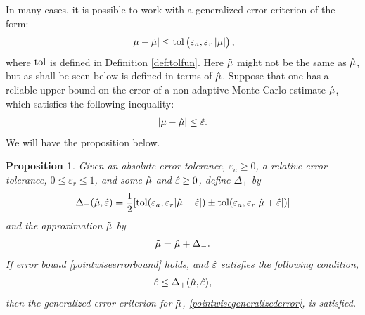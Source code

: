 \documentclass{iitthesis}
\newtheorem{proposition}[theorem]{Proposition}
\theoremstyle{definition}
\begin{document}
In many cases, it is possible to work with a generalized error criterion of the form:
\begin{align}|\mu -\tilde{\mu}| \leq \operatorname{tol} \left(\varepsilon_a,\varepsilon_r \left \lvert \mu \right \rvert\right),\label{pointwisegeneralizederror} 
\end{align}
where $\operatorname{tol}$ is defined in Definition \ref{def:tolfun}. Here $\tilde{\mu}$ might not be the same as $\hat{\mu}$, but as shall be seen below is defined in terms of $\hat{\mu}$. Suppose that one has a reliable upper bound on the error of a non-adaptive Monte Carlo estimate $\hat{\mu}$, which satisfies the following inequality:
\begin{align}
|\mu-\hat{\mu}| \leq \hat{\varepsilon}.  \label{pointwiseerrorbound} 
\end{align} We will have the proposition below.

\begin{proposition}\label{meanMCgProp}
Given an absolute error tolerance, $\varepsilon_a\geq 0$, a relative error tolerance, $0 \leq \varepsilon_r\le 1$, and some $\hat{\mu}$ and $\hat{\varepsilon}\geq 0$, define $\Delta_\pm$ by
\begin{align}\Delta_{\pm}(\hat{\mu},\hat{\varepsilon}) = \frac{1}{2} [\operatorname{tol}(\varepsilon_a, \varepsilon_r |\hat{\mu}-\hat{\varepsilon}|) \pm \operatorname{tol}(\varepsilon_a, \varepsilon_r |\hat{\mu}+\hat{\varepsilon}|)] \label{deltadef}
\end{align}
and the approximation $\tilde{\mu}$ by
\begin{align}
\tilde{\mu} = \hat{\mu} + \Delta_{-}. \label{appxsol}
\end{align}
If error bound \eqref{pointwiseerrorbound} holds, and $\hat{\varepsilon}$ satisfies the following condition,
\begin{align}
\hat{\varepsilon}\leq \Delta_{+}(\hat{\mu},\hat{\varepsilon}),\label{deltacondition}
\end{align}
 then the generalized error criterion for $\tilde{\mu}$, \eqref{pointwisegeneralizederror}, is satisfied. 
 \end{proposition}
\end{document}
